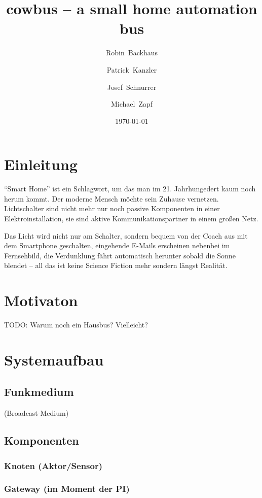 \documentclass{IEEEtran}
\begin{document}
\title{cowbus -- a small home automation bus}
\author{Robin~Backhaus \and Patrick~Kanzler \and Josef~Schnurrer \and Michael~Zapf}
\date{\today}



\maketitle

\begin{abstract}
\end{abstract}


\section{Einleitung}
\enquote{Smart Home} ist ein Schlagwort, um das man im 21. Jahrhungedert
kaum noch herum kommt. Der moderne Mensch möchte sein Zuhause vernetzen.
Lichtschalter sind nicht mehr nur noch passive Komponenten in einer
Elektroinstallation, sie sind aktive Kommunikationspartner in einem großen Netz.

Das Licht wird nicht nur am Schalter, sondern bequem von der Coach aus mit dem
Smartphone geschalten, eingehende E-Mails erscheinen nebenbei im Fernsehbild,
die Verdunklung fährt automatisch herunter sobald die Sonne blendet --
all das ist keine Science Fiction mehr sondern längst Realität.

\section{Motivaton}
TODO: Warum noch ein Hausbus? Vielleicht?

\section{Systemaufbau}
    \subsection{Funkmedium}
        (Broadcast-Medium)

    \subsection{Komponenten}
        \subsubsection{Knoten (Aktor/Sensor)}
        \subsubsection{Gateway (im Moment der PI)}
    
\end{document}
